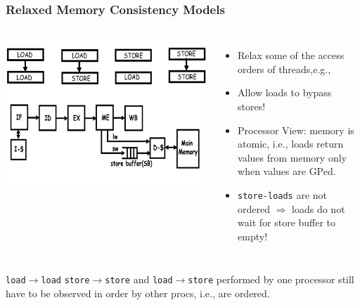 \documentclass{beamer}
\begin{document}
\begin{frame}[fragile,t]
\frametitle{Relaxed Memory Consistency Models}

\begin{columns}
\includegraphics[width=39ex]{Ch7Figs/SeqConsRelatexOrders}\pause
{}
\begin{itemize}
    \item Relax some of the access orders of threads,e.g.,
    \item Allow loads to bypass stores!
    \item Processor View: memory is atomic, i.e., loads return 
            values from memory only when values are GPed.
    \item {\tt store-loads} are not ordered $\Rightarrow$ 
            loads do not wait for store buffer to empty!  
\end{itemize}
\end{columns}
\bigskip

{\tt load$\rightarrow$load} {\tt store$\rightarrow$store} and {\tt load$\rightarrow$store}
performed by one processor still have to be observed in order by other procs, i.e., are ordered.

\end{frame}
\end{document}
